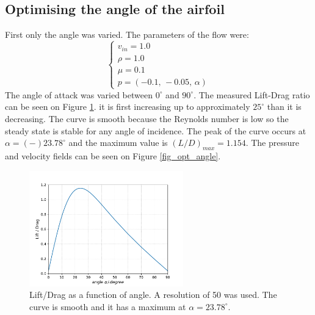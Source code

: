 \documentclass[12pt, a4paper]{article}
\begin{document}
\subsection{Optimising the angle of the airfoil}
First only the angle was varied. The parameters of the flow were:
\begin{equation}
\begin{cases}
v_{in} = 1.0 \\
\rho = 1.0 \\
\mu = 0.1 \\
p = (-0.1,\, -0.05,\, \alpha)
\end{cases}
\end{equation}
The angle of attack was varied between $0^\circ$ and $90^\circ$. The measured Lift-Drag ratio can be seen on Figure \ref{fig_lift_drag}. it is first increasing up to approximately $25^\circ$ than it is decreasing. The curve is smooth because the Reynolds number is low so the steady state is stable for any angle of incidence. The peak of the curve occurs at $\alpha = (-) 23.78^\circ$ and the maximum value is $(L/D)_{max} = 1.154$. The pressure and velocity fields can be seen on Figure \ref{fig_opt_angle}.
\begin{figure}[htbp]
    \centering
    \includegraphics[height=5cm]{lift_drag.pdf}
    \caption{Lift/Drag as a function of angle. A resolution of 50 was used. The curve is smooth and it has a maximum at $\alpha = 23.78^\circ$.}
    \label{fig_lift_drag}
\end{figure}
\end{document}
